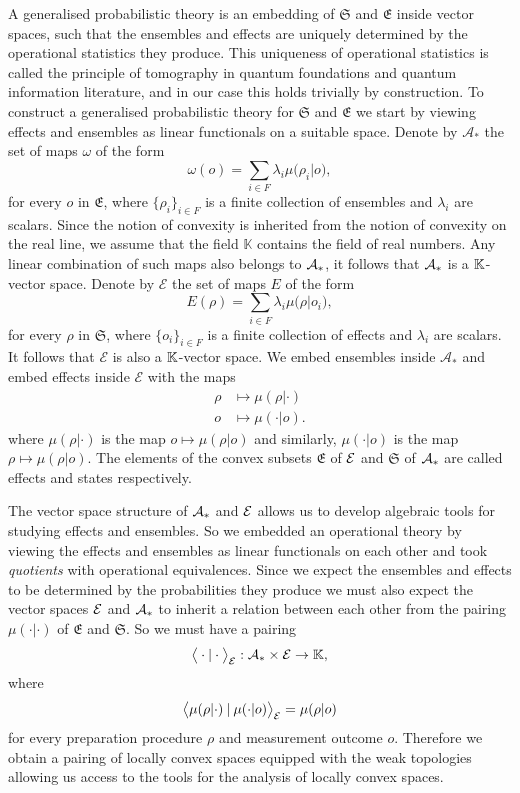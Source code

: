 \documentclass[11pt]{article}
\begin{document}
A generalised probabilistic theory is an embedding of $\mathfrak{S}$ and $\mathfrak{E}$ inside vector spaces, such that the ensembles and effects are uniquely determined by the operational statistics they produce. This uniqueness of operational statistics is called the principle of tomography in quantum foundations and quantum information literature, and in our case this holds trivially by construction. To construct a generalised probabilistic theory for $\mathfrak{S}$ and $\mathfrak{E}$ we start by viewing effects and ensembles as linear functionals on a suitable space. Denote by $\mathcal{A}_*$ the set of maps $\omega$ of the form
$$\omega(o)=\textstyle\sum_{i\in F} \lambda_i \mu\big(\rho_i |o\big),$$
for every $o$ in $\mathfrak{E}$, where $\{\rho_i\}_{i\in F}$ is a finite collection of ensembles and $\lambda_i$ are scalars. Since the notion of convexity is inherited from the notion of convexity on the real line, we assume that the field $\mathbb{K}$ contains the field of real numbers. Any linear combination of such maps also belongs to $\mathcal{A}_* $, it follows that $\mathcal{A}_* $ is a $\mathbb{K}$-vector space. Denote by $\mathcal{E}$ the set of maps $E$ of the form
$$E(\rho)=\textstyle\sum_{i\in F}\lambda_i \mu\big(\rho | o_i\big),$$
for every $\rho$ in $\mathfrak{S}$, where $\{o_i\}_{i\in F}$ is a finite collection of effects and $\lambda_i$ are scalars. It follows that $\mathcal{E}$ is also a $\mathbb{K}$-vector space. We embed ensembles inside $\mathcal{A}_*$ and embed effects inside $\mathcal{E}$ with the maps
\begin{align*}
	\rho &\mapsto \mu(\rho|\cdot)\\
	o &\mapsto \mu(\cdot|o).
\end{align*}
where $\mu(\rho|\cdot)$ is the map $o \mapsto \mu(\rho|o)$ and similarly, $\mu(\cdot|o)$ is the map $\rho\mapsto \mu(\rho|o)$. The elements of the convex subsets $\mathfrak{E}$ of $\mathcal{E}$ and $\mathfrak{S}$ of $\mathcal{A}_* $ are called effects and states respectively.

The vector space structure of $\mathcal{A}_* $ and $\mathcal{E}$ allows us to develop algebraic tools for studying effects and ensembles. So we embedded an operational theory by viewing the effects and ensembles as linear functionals on each other and took \emph{quotients} with operational equivalences. Since we expect the ensembles and effects to be determined by the probabilities they produce we must also expect the vector spaces $\mathcal{E}$ and $\mathcal{A}_* $ to inherit a relation between each other from the pairing $\mu(\cdot|\cdot)$ of $\mathfrak{E}$ and $\mathfrak{S}$. So we must have a pairing 
$$\big\langle\cdot|\cdot\big\rangle_{\mathcal{E}} : \mathcal{A}_*\times \mathcal{E}\to \mathbb{K},$$
where $$\big\langle \mu(\rho|\cdot)\:|\:\mu(\cdot|o)\big\rangle_{\mathcal{E}}=\mu(\rho|o)$$
for every preparation procedure $\rho$ and measurement outcome $o$. Therefore we obtain a pairing of locally convex spaces equipped with the weak topologies allowing us access to the tools for the analysis of locally convex spaces.
\end{document}
